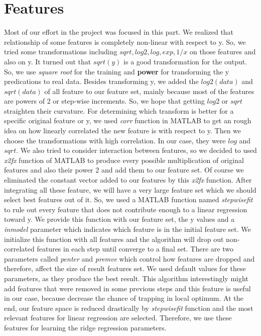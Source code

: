 \documentclass[a4paper, 11pt]{article}
\begin{document}
\section{Features}
Most of our effort in the project was focused in this part. We realized that relationship of some features is completely non-linear with respect to y. So, we tried some transformations including $sqrt, log2, log, exp, 1/x$ on those features and also on y. It turned out that \textit{$sqrt(y)$} is a good transformation for the output. So, we use \textit{square root} for the training and \textbf{power} for transforming the y predications to real data. Besides transforming y, we added the $log2(data)$ and $sqrt(data)$ of all feature to our feature set, mainly because most of the features are powers of 2 or step-wise increments. So, we hope that getting $log2$ or $sqrt$ straighten their curvature. For determining which transform is better for a specific original feature or y, we used \textit{corr} function in MATLAB to get an rough idea on how linearly correlated the new feature is with respect to y. Then we choose the transformations with high correlation. In our case, they were $log$ and $sqrt$.  We also tried to  consider interaction between features, so we decided to used \textit{x2fx} function of MATLAB to produce every possible multiplication of original features and also their power 2 and add them to our feature set. Of course we eliminated the constant vector added to our features by this \textit{x2fx} function. After integrating all these feature, we will have a very large feature set which we should select best features out of it. So, we used a MATLAB function named \textit{stepwisefit} to rule out every feature that does not contribute enough to a linear regression toward y. We provide this function with our feature set, the y values and a \textit{inmodel} parameter which indicates which feature is in the initial feature set. We initialize this function with all features and the algorithm will drop out non-correlated features in each step until converge to a final set. There are two parameters called \textit{penter} and \textit{premve} which control how features are dropped and therefore, affect the size of result features set. We used default values for these parameters, as they produce the best result. This algorithm interestingly might add features that were removed in some previous steps and this feature is useful in our case, because decrease the chance of trapping in local optimum. At the end, our feature space is reduced drastically by \textit{stepwisefit} function and the most relevant features for linear regression are selected. Therefore, we use these features for learning the ridge regression parameters. 
\end{document}
